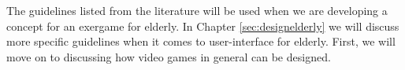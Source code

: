 The guidelines listed from the literature will be used when we are developing a concept for an exergame for elderly. In Chapter \ref{sec:designelderly} we will discuss more specific guidelines when it comes to user-interface for elderly. First, we will move on to discussing how video games in general can be designed. 





